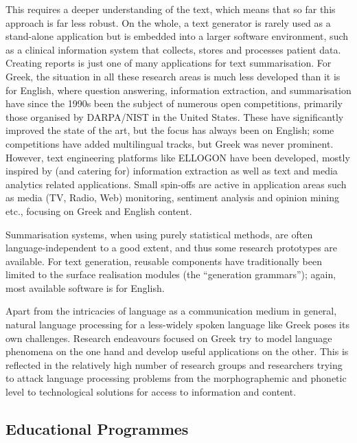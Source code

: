 \begin{multicols}{2}

This requires a deeper understanding of the text, which means that so far this approach is far less robust. On the whole, a text generator is rarely used as a stand-alone application but is embedded into a larger software environment, such as a clinical information system that collects, stores and processes patient data. Creating reports is just one of many applications for text summarisation. 
For Greek, the situation in all these research areas is much less developed than it is for English, where question answering, information extraction, and summarisation have since the 1990s been the subject of numerous open competitions, primarily those organised by DARPA/NIST in the United States. These have significantly improved the state of the art, but the focus has always been on English; some competitions have added multilingual tracks, but Greek was never prominent. However, text engineering platforms like ELLOGON have been developed, mostly inspired by (and catering for) information extraction as well as text and media analytics related applications. Small spin-offs are active in application areas such as media (TV, Radio, Web) monitoring, sentiment analysis and opinion mining etc., focusing on Greek and English content.

Summarisation systems, when using purely statistical methods, are often language-independent to a good extent, and thus some research prototypes are available. For text generation, reusable components have traditionally been limited to the surface realisation modules (the “generation grammars”); again, most available software is for English.

Apart from the intricacies of language as a communication medium in general, natural language processing for a less-widely spoken language like Greek poses its own challenges. Research endeavours focused on Greek try to model language phenomena on the one hand and develop useful applications on the other. This is reflected in the relatively high number of research groups and researchers trying to attack language processing problems from the morphographemic and phonetic level to technological solutions for access to information and content.

\subsection{Educational Programmes}


\end{multicols}
